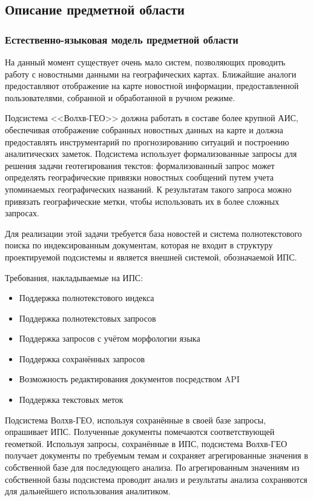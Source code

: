 \subsection{Описание предметной области}
\subsubsection{Естественно-языковая модель предметной области}

На данный момент существует очень мало систем, позволяющих проводить работу с новостными данными на географических картах. Ближайшие аналоги предоставляют отображение на карте новостной информации, предоставленной пользователями, собранной и обработанной в ручном режиме.

Подсистема <<Волхв-ГЕО>> должна работать в составе более крупной АИС, обеспечивая отображение собранных новостных данных на карте и должна предоставлять инструментарий по прогнозированию ситуаций и построению аналитических заметок. Подсистема использует формализованные запросы для решения задачи геотегирования текстов: формализованный запрос может определять географические привязки новостных сообщений путем учета упоминаемых географических названий. К результатам такого запроса можно привязать географические метки, чтобы использовать их в более сложных запросах.

Для реализации этой задачи требуется база новостей и система полнотекстового поиска по индексированным документам, которая не входит в структуру проектируемой подсистемы и является внешней системой, обозначаемой ИПС.

Требования, накладываемые на ИПС:
\begin{itemize}
\item Поддержка полнотекстового индекса
\item Поддержка полнотекстовых запросов
\item Поддержка запросов с учётом морфологии языка
\item Поддержка сохранённых запросов
\item Возможность редактирования документов посредством API
\item Поддержка текстовых меток
\end{itemize}

Подсистема Волхв-ГЕО, используя сохранённые в своей базе запросы, опрашивает ИПС. Полученные документы помечаются соответствующей геометкой. Используя запросы, сохранённые в ИПС, подсистема Волхв-ГЕО получает документы по требуемым темам и сохраняет агрегированные значения в собственной базе для последующего анализа.
По агрегированным значениям из собственной базы подсистема проводит анализ и результаты анализа сохраняются для дальнейшего использования аналитиком.

